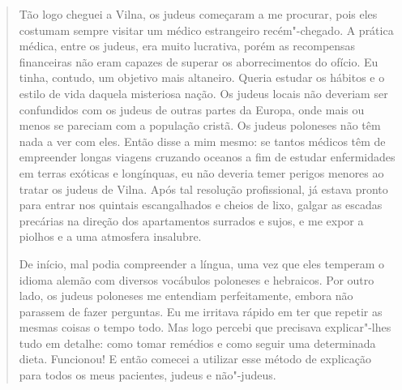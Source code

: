 \begin{quote}
Tão logo cheguei a Vilna, os judeus começaram a me procurar, pois eles
costumam sempre visitar um médico estrangeiro recém"-chegado. A prática
médica, entre os judeus, era muito lucrativa, porém as recompensas
financeiras não eram capazes de superar os aborrecimentos do ofício. Eu
tinha, contudo, um objetivo mais altaneiro. Queria estudar os hábitos e
o estilo de vida daquela misteriosa nação. Os judeus locais não deveriam
ser confundidos com os judeus de outras partes da Europa, onde mais ou
menos se pareciam com a população cristã. Os judeus poloneses não têm
nada a ver com eles. Então disse a mim mesmo: se tantos médicos têm de
empreender longas viagens cruzando oceanos a fim de estudar enfermidades
em terras exóticas e longínquas, eu não deveria temer perigos menores ao
tratar os judeus de Vilna. Após tal resolução profissional, já estava
pronto para entrar nos quintais escangalhados e cheios de lixo, galgar
as escadas precárias na direção dos apartamentos surrados e sujos, e me
expor a piolhos e a uma atmosfera insalubre.

De início, mal podia compreender a língua, uma vez que eles temperam o
idioma alemão com diversos vocábulos poloneses e hebraicos. Por outro
lado, os judeus poloneses me entendiam perfeitamente, embora não
parassem de fazer perguntas. Eu me irritava rápido em ter que repetir as
mesmas coisas o tempo todo. Mas logo percebi que precisava explicar"-lhes
tudo em detalhe: como tomar remédios e como seguir uma determinada
dieta. Funcionou! E então comecei a utilizar esse método de explicação
para todos os meus pacientes, judeus e não"-judeus.


\end{quote}
